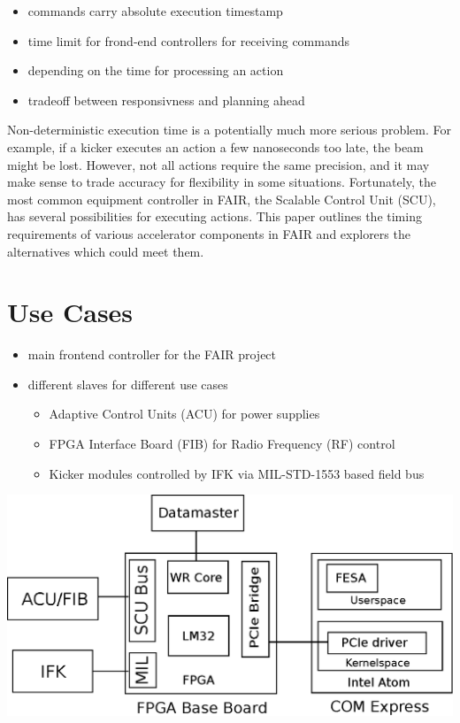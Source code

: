 \documentclass[25pt,halfparskip-,pagesize]{scrartcl}
\begin{document}
\begin{multicols*}{3}
\begin{itemize}
  \item commands carry absolute execution timestamp
  \item time limit for frond-end controllers for receiving commands
  \item depending on the time for processing an action
  \item tradeoff between responsivness and planning ahead
\end{itemize}

Non-deterministic execution time is a potentially much more serious problem.
For example, if a kicker executes an action a few nanoseconds too late,
the beam might be lost.
However, not all actions require the same precision,
and it may make sense to trade accuracy for flexibility in some situations.
Fortunately, the  most common equipment controller in FAIR,
the Scalable Control Unit (SCU),
has several possibilities for executing actions.
This paper outlines the timing requirements of various accelerator
components in FAIR and explorers the alternatives which could meet them.

\section{Use Cases}
\begin{itemize}
	\item main frontend controller for the FAIR project
        \item different slaves for different use cases
        \begin{itemize} 
	  \item Adaptive Control Units (ACU) for power supplies
          \item FPGA Interface Board (FIB) for Radio Frequency (RF) control
          \item Kicker modules controlled by IFK via MIL-STD-1553 based field bus
        \end{itemize}
\end{itemize}

\includegraphics[width=\columnwidth]{../images/WEPD48f2}
\label{fig:block_diagram}




\end{multicols*}
\end{document}
